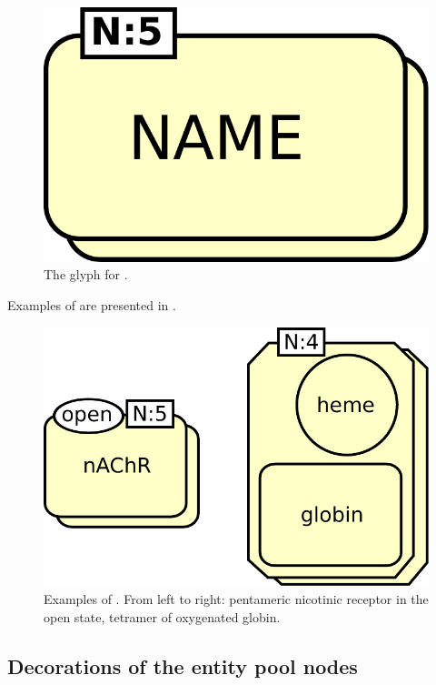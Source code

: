 \begin{figure}[H]
  \centering
  \includegraphics[scale = 0.3]{le_images/multimer}
  \caption{The \PD glyph for . }
  \label{fig:multimer}
\end{figure}

Examples of  are presented in .

\begin{figure}[H]
  \centering
  \includegraphics[scale = 0.5]{le_images/multimer-examples}
  \caption{Examples of . From left to right: pentameric nicotinic receptor in the open state, tetramer of oxygenated globin.}
  \label{fig:multimer-examples}
\end{figure}


\subsection{Decorations of the entity pool nodes}\label{sec:decorations}

